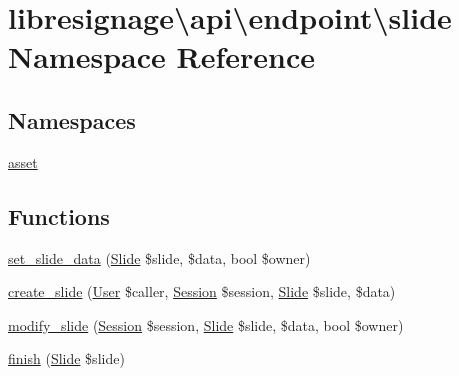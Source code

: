 \hypertarget{namespacelibresignage_1_1api_1_1endpoint_1_1slide}{}\section{libresignage\textbackslash{}api\textbackslash{}endpoint\textbackslash{}slide Namespace Reference}
\label{namespacelibresignage_1_1api_1_1endpoint_1_1slide}
\subsection*{Namespaces}
\begin{DoxyCompactItemize}
\item 
 \hyperlink{namespacelibresignage_1_1api_1_1endpoint_1_1slide_1_1asset}{asset}
\end{DoxyCompactItemize}
\subsection*{Functions}
\begin{DoxyCompactItemize}
\item 
\hyperlink{namespacelibresignage_1_1api_1_1endpoint_1_1slide_acd9b331303687c167e2101971e0a1968}{set\+\_\+slide\+\_\+data} (\hyperlink{classlibresignage_1_1common_1_1php_1_1slide_1_1Slide}{Slide} \$slide, \$data, bool \$owner)
\item 
\hyperlink{namespacelibresignage_1_1api_1_1endpoint_1_1slide_a77dd0fedf73d886c2c4c08f72fbe1715}{create\+\_\+slide} (\hyperlink{classlibresignage_1_1common_1_1php_1_1auth_1_1User}{User} \$caller, \hyperlink{classlibresignage_1_1common_1_1php_1_1auth_1_1Session}{Session} \$session, \hyperlink{classlibresignage_1_1common_1_1php_1_1slide_1_1Slide}{Slide} \$slide, \$data)
\item 
\hyperlink{namespacelibresignage_1_1api_1_1endpoint_1_1slide_a0083bc7dc1513e4a25549e74cca6521d}{modify\+\_\+slide} (\hyperlink{classlibresignage_1_1common_1_1php_1_1auth_1_1Session}{Session} \$session, \hyperlink{classlibresignage_1_1common_1_1php_1_1slide_1_1Slide}{Slide} \$slide, \$data, bool \$owner)
\item 
\hyperlink{namespacelibresignage_1_1api_1_1endpoint_1_1slide_a720121a1a9d64869e0980f74c6740766}{finish} (\hyperlink{classlibresignage_1_1common_1_1php_1_1slide_1_1Slide}{Slide} \$slide)
\end{DoxyCompactItemize}


